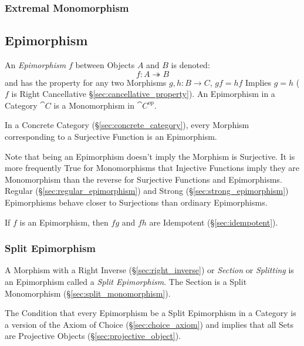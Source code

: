 \subsubsection{Extremal Monomorphism}\label{sec:extremal_monomorphism}



\subsection{Epimorphism}\label{sec:epimorphism}

An \emph{Epimorphism} $f$ between Objects $A$ and $B$ is denoted:
\[
  f : A \twoheadrightarrow B
\]
and has the property for any two Morphisms $g, h : B \rightarrow C$,
$gf = hf$ Implies $g = h$ ($f$ is Right Cancellative
\S\ref{sec:cancellative_property}). An Epimorphism in a Category
$\cat{C}$ is a Monomorphism in $\cat{C^{op}}$.

In a Concrete Category (\S\ref{sec:concrete_category}), every Morphism
corresponding to a Surjective Function is an Epimorphism.

\fist Note that being an Epimorphism doesn't imply the Morphism
is Surjective. It is more frequently True for Monomorphisms that
Injective Functions imply they are Monomorphism than the reverse for
Surjective Functions and Epimorphisms. Regular
(\S\ref{sec:regular_epimorphism}) and Strong
(\S\ref{sec:strong_epimorphism}) Epimorphisms behave closer to
Surjections than ordinary Epimorphisms.

If $f$ is an Epimorphism, then $fg$ and $fh$ are Idempotent
(\S\ref{sec:idempotent}). %



\subsubsection{Split Epimorphism}\label{sec:split_epimorphism}

A Morphism with a Right Inverse (\S\ref{sec:right_inverse}) or
\emph{Section} or \emph{Splitting} is an Epimorphism called a
\emph{Split Epimorphism}. The Section is a Split Monomorphism
(\S\ref{sec:split_monomorphism}).

The Condition that every Epimorphism be a Split Epimorphism in a
Category is a version of the Axiom of Choice
(\S\ref{sec:choice_axiom}) and implies that all Sets are Projective
Objects (\S\ref{sec:projective_object}).\cite{awodey06}



